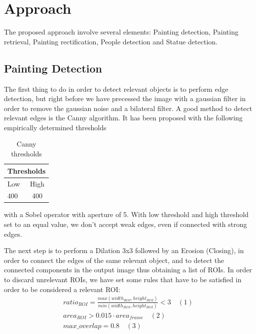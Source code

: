\documentclass[10pt,twocolumn,letterpaper]{article}
\begin{document}
\section{Approach}

The proposed approach involve several elements: Painting detection, Painting retrieval, 
Painting rectification, People detection and Statue detection.

\subsection{Painting Detection}

The first thing to do in order to detect relevant objects is to perform edge detection, but right before we have 
precessed the image with a gaussian filter in order to remove the gaussian noise and a bilateral filter. 
A good method to detect relevant edges is the Canny algorithm. It has been proposed with the following empirically determined thresholds 

\begin{table}[h!]
\begin{center}
\begin{tabular}{|l|c|}
\hline
\multicolumn{2}{|c|}{Thresholds}  \\
\hline
Low & High \\
\hline
400 & 400 \\ 
\hline
\end{tabular}
\caption{Canny thresholds}
\end{center}
\end{table}

with a Sobel operator with aperture of 5. With low threshold and high threshold set to an equal value, we don't accept weak edges, even if connected with strong edges.

The next step is to perform a Dilation 3x3 followed by an Erosion (Closing), in order to 
connect the edges of the same relevant object, and to detect the connected components in the output image 
thus obtaining a list of ROIs.
In order to discard unrelevant ROIs, we have set some rules that have to be satisfied in order to be considered
a relevant ROI: 
\begin{gather*}
	ratio_{ROI} =  \frac{max(width_{ROI}, height_{ROI})}{min(width_{ROI}, height_{ROI})} <  3 \quad (1)\\
	area_{ROI} > 0.015 \cdot area_{frame} \quad (2)\\ 
	max\_overlap = 0.8 \quad (3)
\end{gather*}
\end{document}
